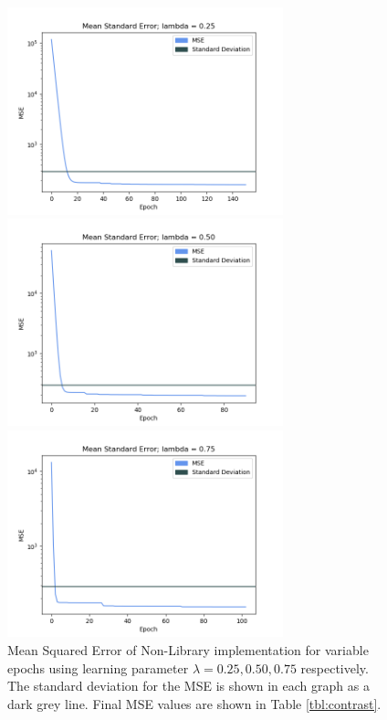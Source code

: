 \documentclass[letterpaper]{article} %
\begin{document}
\begin{figure}[htbp]
\centerline{\includegraphics[width=8cm]{trees_25.png}}
\centerline{\includegraphics[width=8cm]{trees_50.png}}
\centerline{\includegraphics[width=8cm]{trees_75.png}}
\caption{Mean Squared Error of Non-Library implementation for variable epochs using learning parameter
$\lambda = 0.25,0.50,0.75$ respectively.
The standard deviation for the MSE is shown in each graph as a dark grey line.
Final MSE values are shown in Table \ref{tbl:contrast}.}
\label{fig:mse_evaluation}
\end{figure}
\end{document}
